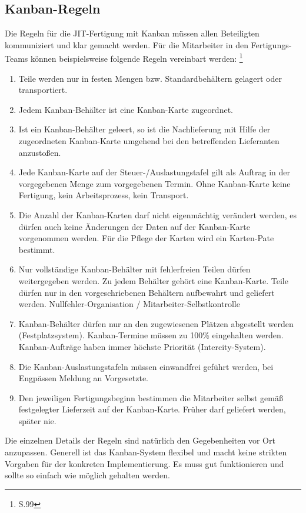 \subsection{Kanban-Regeln}
Die Regeln für die JIT-Fertigung mit Kanban müssen allen Beteiligten kommuniziert und klar gemacht werden.
Für die Mitarbeiter in den Fertigungs-Teams können beispielsweise folgende Regeln vereinbart werden: \footnote{\cite{Weber2014KE} S.99}\\
\begin{enumerate}
\item Teile werden nur in festen Mengen bzw. Standardbehältern gelagert oder transportiert.
\item Jedem Kanban-Behälter ist eine Kanban-Karte zugeordnet.
\item Ist ein Kanban-Behälter geleert, so ist die Nachlieferung mit Hilfe der zugeordneten Kanban-Karte umgehend bei den betreffenden Lieferanten anzustoßen.
\item Jede Kanban-Karte auf der Steuer-/Auslastungstafel gilt als Auftrag in der vorgegebenen Menge zum vorgegebenen Termin. Ohne Kanban-Karte keine Fertigung, kein Arbeitsprozess, kein Transport.
\item Die Anzahl der Kanban-Karten darf nicht eigenmächtig verändert werden, es dürfen auch keine Änderungen der Daten auf der Kanban-Karte vorgenommen werden. Für die Pflege der Karten wird ein Karten-Pate bestimmt.
\item Nur vollständige Kanban-Behälter mit fehlerfreien Teilen dürfen weitergegeben werden. Zu jedem Behälter gehört eine Kanban-Karte. Teile dürfen nur in den vorgeschriebenen Behältern aufbewahrt und geliefert werden. Nullfehler-Organisation / Mitarbeiter-Selbstkontrolle
\item Kanban-Behälter dürfen nur an den zugewiesenen Plätzen abgestellt werden (Festplatzsystem). Kanban-Termine müssen zu 100\% eingehalten werden. Kanban-Aufträge haben immer höchste Priorität (Intercity-System).
\item Die Kanban-Auslastungstafeln müssen einwandfrei geführt werden, bei Engpässen Meldung an Vorgesetzte.
\item Den jeweiligen Fertigungsbeginn bestimmen die Mitarbeiter selbst gemäß festgelegter Lieferzeit auf der Kanban-Karte. Früher darf geliefert werden, später nie.
\end{enumerate}
Die einzelnen Details der Regeln sind natürlich den Gegebenheiten vor Ort anzupassen.
Generell ist das Kanban-System flexibel und macht keine strikten Vorgaben für der konkreten Implementierung.
Es muss gut funktionieren und sollte so einfach wie möglich gehalten werden.

